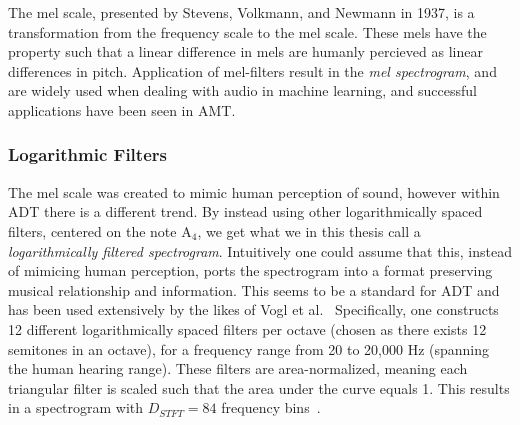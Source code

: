The mel scale, presented by Stevens, Volkmann, and Newmann in 1937, is a transformation from the frequency scale to the mel scale. These mels have the property such that a linear difference in mels are humanly percieved as linear differences in pitch. Application of mel-filters result in the \textit{mel spectrogram}, and are widely used when dealing with audio in machine learning, and successful applications have been seen in \gls{AMT}.~\cite{wolfmonheim2024spectralrhythmfeaturesaudio, gardner2022mt3multitaskmultitrackmusic, chang2024yourmt3+, 8350302, gong2021astaudiospectrogramtransformer, zehren2024analyzingreducingsynthetictorealtransfer}

\subsubsection{Logarithmic Filters}

The mel scale was created to mimic human perception of sound, however within \gls{ADT} there is a different trend. By instead using other logarithmically spaced filters, centered on the note $\text{A}_4$, we get what we in this thesis call a \textit{logarithmically filtered spectrogram}. Intuitively one could assume that this, instead of mimicing human perception, ports the spectrogram into a format preserving musical relationship and information. This seems to be a standard for \gls{ADT} and has been used extensively by the likes of Vogl et al.~\cite{Vogl2017DrumTV, vogl2018multiinstrumentdrumtranscription} Specifically, one constructs 12 different logarithmically spaced filters per octave (chosen as there exists 12 semitones in an octave), for a frequency range from 20 to 20,000 Hz (spanning the human hearing range). These filters are area-normalized, meaning each triangular filter is scaled such that the area under the curve equals 1. This results in a spectrogram with $D_{STFT} = 84$ frequency bins~\cite{8350302, signals4040042}.

